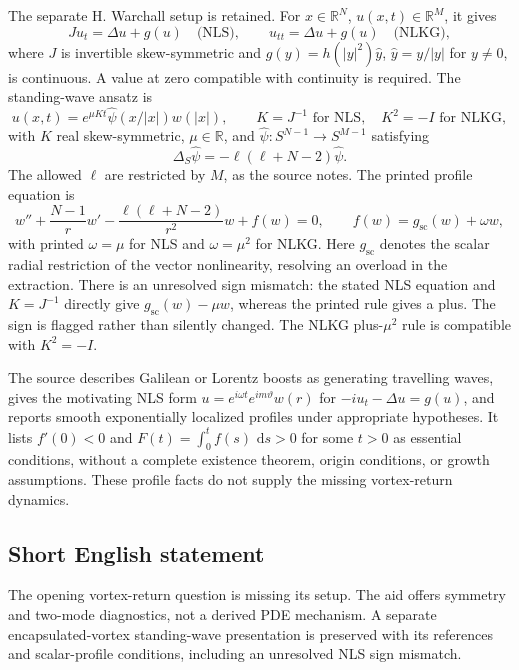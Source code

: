 \documentclass[11pt]{article}
\newcommand{\R}{\mathbb{R}}
\newcommand{\dd}{\,\mathrm{d}}
\begin{document}
The separate H. Warchall setup is retained. For $x\in\R^N$, $u(x,t)\in\R^M$, it gives
\[
Ju_t=\Delta u+g(u)\quad\text{(NLS)},\qquad
u_{tt}=\Delta u+g(u)\quad\text{(NLKG)},
\]
where $J$ is invertible skew-symmetric and $g(y)=h(|y|^2)\widehat y$, $\widehat y=y/|y|$ for $y\ne0$, is continuous. A value at zero compatible with continuity is required. The standing-wave ansatz is
\[
u(x,t)=e^{\mu Kt}\widehat\psi(x/|x|)w(|x|),\qquad
K=J^{-1}\text{ for NLS},\quad K^2=-I\text{ for NLKG},
\]
with $K$ real skew-symmetric, $\mu\in\R$, and $\widehat\psi:S^{N-1}\to S^{M-1}$ satisfying
\[
\Delta_S\widehat\psi=-\ell(\ell+N-2)\widehat\psi.
\]
The allowed $\ell$ are restricted by $M$, as the source notes. The printed profile equation is
\[
w''+\frac{N-1}{r}w'-\frac{\ell(\ell+N-2)}{r^2}w+f(w)=0,
\qquad f(w)=g_{\mathrm{sc}}(w)+\omega w,
\]
with printed $\omega=\mu$ for NLS and $\omega=\mu^2$ for NLKG. Here $g_{\mathrm{sc}}$ denotes the scalar radial restriction of the vector nonlinearity, resolving an overload in the extraction. There is an unresolved sign mismatch: the stated NLS equation and $K=J^{-1}$ directly give $g_{\mathrm{sc}}(w)-\mu w$, whereas the printed rule gives a plus. The sign is flagged rather than silently changed. The NLKG plus-$\mu^2$ rule is compatible with $K^2=-I$.

The source describes Galilean or Lorentz boosts as generating travelling waves, gives the motivating NLS form $u=e^{i\omega t}e^{im\vartheta}w(r)$ for $-iu_t-\Delta u=g(u)$, and reports smooth exponentially localized profiles under appropriate hypotheses. It lists $f'(0)<0$ and $F(t)=\int_0^t f(s)\,\dd s>0$ for some $t>0$ as essential conditions, without a complete existence theorem, origin conditions, or growth assumptions. These profile facts do not supply the missing vortex-return dynamics.
\subsection{Short English statement}
The opening vortex-return question is missing its setup. The aid offers symmetry and two-mode diagnostics, not a derived PDE mechanism. A separate encapsulated-vortex standing-wave presentation is preserved with its references and scalar-profile conditions, including an unresolved NLS sign mismatch.
\end{document}
